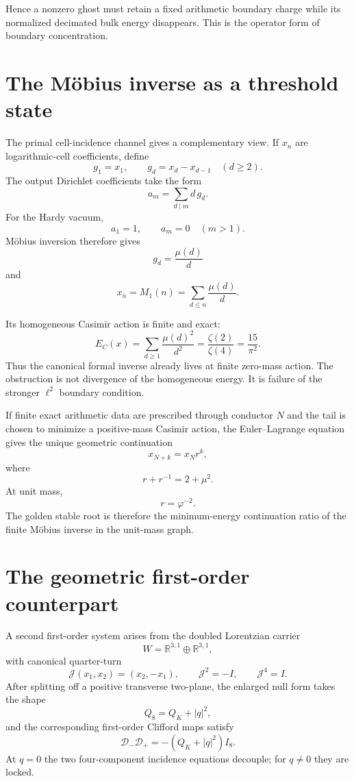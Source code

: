 \documentclass[11pt]{article}
\theoremstyle{definition}
\theoremstyle{remark}
\newcommand{\R}{\mathbb R}
\begin{document}
Hence a nonzero ghost must retain a fixed arithmetic boundary charge while its normalized decimated bulk energy disappears.  This is the operator form of boundary concentration.

\section{The Möbius inverse as a threshold state}

The primal cell-incidence channel gives a complementary view.  If \(x_n\) are logarithmic-cell coefficients, define
\[
g_1=x_1,\qquad
g_d=x_d-x_{d-1}\quad(d\ge2).
\]
The output Dirichlet coefficients take the form
\[
a_m=\sum_{d\mid m}d\,g_d.
\]
For the Hardy vacuum,
\[
a_1=1,\qquad a_m=0\quad(m>1).
\]
Möbius inversion therefore gives
\[
g_d=\frac{\mu(d)}{d}
\]
and
\[
\boxed{
x_n=M_1(n)
=
\sum_{d\le n}\frac{\mu(d)}{d}.
}
\]

Its homogeneous Casimir action is finite and exact:
\[
\boxed{
E_C(x)
=
\sum_{d\ge1}\frac{\mu(d)^2}{d^2}
=
\frac{\zeta(2)}{\zeta(4)}
=
\frac{15}{\pi^2}.
}
\]
Thus the canonical formal inverse already lives at finite zero-mass action.  The obstruction is not divergence of the homogeneous energy.  It is failure of the stronger \(\ell^2\) boundary condition.

If finite exact arithmetic data are prescribed through conductor \(N\) and the tail is chosen to minimize a positive-mass Casimir action, the Euler--Lagrange equation gives the unique geometric continuation
\[
x_{N+k}=x_Nr^k,
\]
where
\[
r+r^{-1}=2+\mu^2.
\]
At unit mass,
\[
r=\varphi^{-2}.
\]
The golden stable root is therefore the minimum-energy continuation ratio of the finite Möbius inverse in the unit-mass graph.

\section{The geometric first-order counterpart}

A second first-order system arises from the doubled Lorentzian carrier
\[
W=\R^{3,1}\oplus\R^{3,1},
\]
with canonical quarter-turn
\[
\mathcal J(x_1,x_2)=(x_2,-x_1),
\qquad
\mathcal J^2=-I,\qquad
\mathcal J^4=I.
\]
After splitting off a positive transverse two-plane, the enlarged null form takes the shape
\[
Q_8=Q_K+|q|^2,
\]
and the corresponding first-order Clifford maps satisfy
\[
\mathcal D_-\mathcal D_+
=
-(Q_K+|q|^2)I_8.
\]
At \(q=0\) the two four-component incidence equations decouple; for \(q\ne0\) they are locked.
\end{document}
